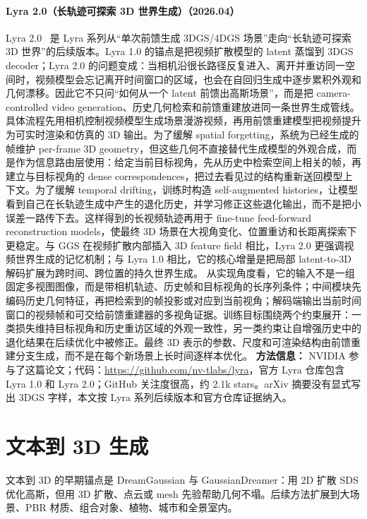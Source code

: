 \paragraph{Lyra 2.0（长轨迹可探索 3D 世界生成）（2026.04）}
Lyra 2.0~\cite{2604_13036} 是 Lyra 系列从“单次前馈生成 3DGS/4DGS 场景”走向“长轨迹可探索 3D 世界”的后续版本。Lyra 1.0 的锚点是把视频扩散模型的 latent 蒸馏到 3DGS decoder；Lyra 2.0 的问题变成：当相机沿很长路径反复进入、离开并重访同一空间时，视频模型会忘记离开时间窗口的区域，也会在自回归生成中逐步累积外观和几何漂移。因此它不只问“如何从一个 latent 前馈出高斯场景”，而是把 camera-controlled video generation、历史几何检索和前馈重建放进同一条世界生成管线。
具体流程先用相机控制视频模型生成场景漫游视频，再用前馈重建模型把视频提升为可实时渲染和仿真的 3D 输出。为了缓解 spatial forgetting，系统为已经生成的帧维护 per-frame 3D geometry，但这些几何不直接替代生成模型的外观合成，而是作为信息路由层使用：给定当前目标视角，先从历史中检索空间上相关的帧，再建立与目标视角的 dense correspondences，把过去看见过的结构重新送回模型上下文。为了缓解 temporal drifting，训练时构造 self-augmented histories，让模型看到自己在长轨迹生成中产生的退化历史，并学习修正这些退化输出，而不是把小误差一路传下去。这样得到的长视频轨迹再用于 fine-tune feed-forward reconstruction models，使最终 3D 场景在大视角变化、位置重访和长距离探索下更稳定。与 GGS 在视频扩散内部插入 3D feature field 相比，Lyra 2.0 更强调视频世界生成的记忆机制；与 Lyra 1.0 相比，它的核心增量是把局部 latent-to-3D 解码扩展为跨时间、跨位置的持久世界生成。
从实现角度看，它的输入不是一组固定多视图图像，而是带相机轨迹、历史帧和目标视角的长序列条件；中间模块先编码历史几何特征，再把检索到的帧投影或对应到当前视角；解码端输出当前时间窗口的视频帧和可交给前馈重建器的多视角证据。训练目标围绕两个约束展开：一类损失维持目标视角和历史重访区域的外观一致性，另一类约束让自增强历史中的退化结果在后续优化中被修正。最终 3D 表示的参数、尺度和可渲染结构由前馈重建分支生成，而不是在每个新场景上长时间逐样本优化。
\textbf{方法信息：} NVIDIA 参与了这篇论文；代码：\url{https://github.com/nv-tlabs/lyra}，官方 Lyra 仓库包含 Lyra 1.0 和 Lyra 2.0；GitHub 关注度很高，约 2.1k stars。arXiv 摘要没有显式写出 3DGS 字样，本文按 Lyra 系列后续版本和官方仓库证据纳入。



\section{文本到 3D 生成}

文本到 3D 的早期锚点是 DreamGaussian 与 GaussianDreamer：用 2D 扩散 SDS 优化高斯，但用 3D 扩散、点云或 mesh 先验帮助几何不塌。后续方法扩展到大场景、PBR 材质、组合对象、植物、城市和全景室内。


